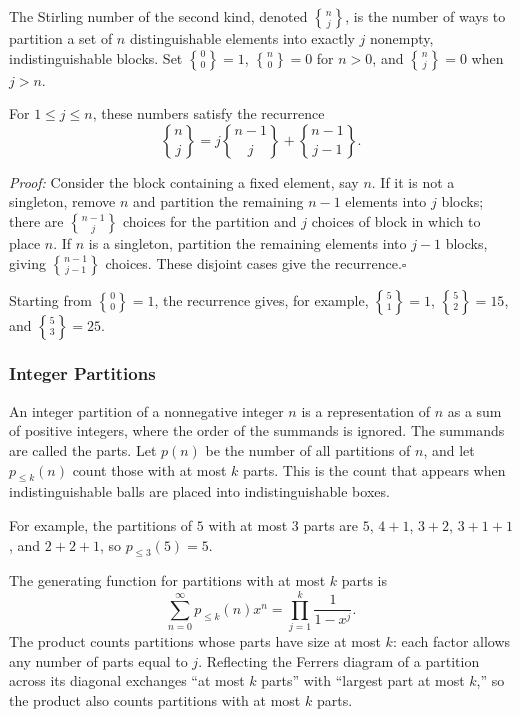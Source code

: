 \documentclass[a4paper,11pt,abstracton]{scrartcl}
\newcommand{\genstirlingII}[3]{%
  \genfrac{\{}{\}}{0pt}{#1}{#2}{#3}%
}
\newcommand{\stirlingII}[2]{\genstirlingII{}{#1}{#2}}
\theoremstyle{dotlessP}
\theoremstyle{dotlessS}
\theoremstyle{remark}
\theoremstyle{definition}
\begin{document}
The Stirling number of the second kind, denoted $\stirlingII{n}{j}$, is the number of ways to partition a set of $n$ distinguishable elements into exactly $j$ nonempty, indistinguishable blocks. Set $\stirlingII{0}{0}=1$, $\stirlingII{n}{0}=0$ for $n>0$, and $\stirlingII{n}{j}=0$ when $j>n$.

For $1\leq j\leq n$, these numbers satisfy the recurrence
\[
  \stirlingII{n}{j}=j\stirlingII{n-1}{j}+\stirlingII{n-1}{j-1}.
\]
\begin{claim_box}
\textit{Proof:} Consider the block containing a fixed element, say $n$. If it is not a singleton, remove $n$ and partition the remaining $n-1$ elements into $j$ blocks; there are $\stirlingII{n-1}{j}$ choices for the partition and $j$ choices of block in which to place $n$. If $n$ is a singleton, partition the remaining elements into $j-1$ blocks, giving $\stirlingII{n-1}{j-1}$ choices. These disjoint cases give the recurrence.\hfill$\square$
\end{claim_box}

Starting from $\stirlingII{0}{0}=1$, the recurrence gives, for example, $\stirlingII{5}{1}=1$, $\stirlingII{5}{2}=15$, and $\stirlingII{5}{3}=25$.

\subsubsection{Integer Partitions}

An integer partition of a nonnegative integer $n$ is a representation of $n$ as a sum of positive integers, where the order of the summands is ignored. The summands are called the parts. Let $p(n)$ be the number of all partitions of $n$, and let $p_{\leq k}(n)$ count those with at most $k$ parts. This is the count that appears when indistinguishable balls are placed into indistinguishable boxes.

For example, the partitions of $5$ with at most $3$ parts are $5$, $4+1$, $3+2$, $3+1+1$, and $2+2+1$, so $p_{\leq 3}(5)=5$.

\begin{problem_box}
The generating function for partitions with at most $k$ parts is
\[
  \sum_{n=0}^{\infty}p_{\leq k}(n)x^n
  =\prod_{j=1}^{k}\frac{1}{1-x^j}.
\]
The product counts partitions whose parts have size at most $k$: each factor allows any number of parts equal to $j$. Reflecting the Ferrers diagram of a partition across its diagonal exchanges “at most $k$ parts” with “largest part at most $k$,” so the product also counts partitions with at most $k$ parts.
\end{problem_box}
\end{document}
